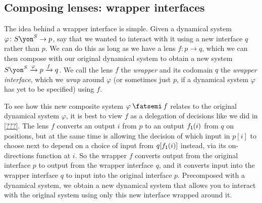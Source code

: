 \documentclass[Book-Poly]{subfiles}
\begin{document}
\subsection{Composing lenses: wrapper interfaces}\label{subsec.poly.dyn_sys.new.wrap}

The idea behind a wrapper interface is simple.
Given a dynamical system $\varphi\colon S\yon^S\to p$, say that we wanted to interact with it using a new interface $q$ rather than $p$.
We can do this as long as we have a lens $f\colon p\to q$, which we can then compose with our original dynamical system to obtain a new system $S\yon^S\To{\varphi}p\To{f}q$.
We call the lens $f$ the \emph{wrapper} and its codomain $q$ the \emph{wrapper interface}, which we \emph{wrap} around $\varphi$ (or sometimes just $p$, if a dynamical system $\varphi$ has yet to be specified) using $f$.

To see how this new composite system $\varphi\then f$ relates to the original dynamical system $\varphi$, it is best to view $f$ as a delegation of decisions like we did in \cref{???}.
The lens $f$ converts an output $i$ from $p$ to an output $f_{\textsf{1}}(i)$ from $q$ on positions, but at the same time is allowing the decision of which input in $p[i]$ to choose next to depend on a choice of input from $q[f_{\textsf{1}}(i)]$ instead, via its on-directions function at $i$.
So the wrapper $f$ converts output from the original interface $p$ to output from the wrapper interface $q$, and it converts input into the wrapper interface $q$ to input into the original interface $p$.
Precomposed with a dynamical system, we obtain a new dynamical system that allows you to interact with the original system using only this new interface wrapped around it.
\end{document}
